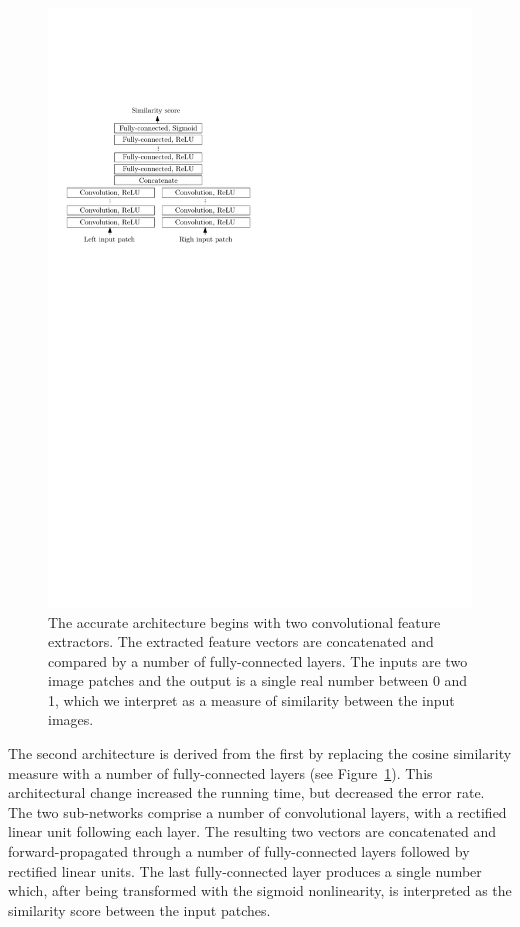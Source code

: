 \documentclass[twoside,11pt]{article}
\begin{document}
\begin{figure}[tb] 
\begin{center}
\includegraphics{img/architecture_accurate.pdf} 
\caption{The accurate architecture begins with two convolutional feature
extractors. The extracted feature vectors are concatenated and compared by
a number of fully-connected layers. The inputs are two image patches and the
output is a single real number between 0 and 1, which we interpret as a measure
of similarity between the input images.}

\label{fig:architecture_accurate}
\end{center}
\end{figure}

The second architecture is derived from the first by replacing the cosine
similarity measure with a number of fully-connected layers (see
Figure~\ref{fig:architecture_accurate}). This architectural change increased
the running time, but decreased the error rate. The two sub-networks comprise a
number of convolutional layers, with a rectified linear unit following each
layer. The resulting two vectors are concatenated and forward-propagated
through a number of fully-connected layers followed by rectified linear units. The
last fully-connected layer produces a single number which, after being
transformed with the sigmoid nonlinearity, is interpreted as the similarity score
between the input patches.
\end{document}
